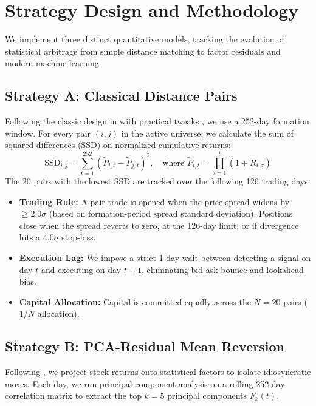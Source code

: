 \section{Strategy Design and Methodology}
\label{sec:methodology}

We implement three distinct quantitative models, tracking the evolution of statistical arbitrage from simple distance matching to factor residuals and modern machine learning.

\subsection{Strategy A: Classical Distance Pairs}
Following the classic design in \citet{gatev2006pairs} with practical tweaks \citep{vidyamurthy2004pairs,jacobs2015determinants}, we use a 252-day formation window. For every pair $(i, j)$ in the active universe, we calculate the sum of squared differences (SSD) on normalized cumulative returns:
\begin{equation}
    \text{SSD}_{i,j} = \sum_{t=1}^{252} \left( \tilde{P}_{i,t} - \tilde{P}_{j,t} \right)^2, \quad \text{where } \tilde{P}_{i,t} = \prod_{\tau=1}^t (1 + R_{i,\tau})
\end{equation}
The 20 pairs with the lowest SSD are tracked over the following 126 trading days.
\begin{itemize}
    \item \textbf{Trading Rule:} A pair trade is opened when the price spread widens by $\ge 2.0\sigma$ (based on formation-period spread standard deviation). Positions close when the spread reverts to zero, at the 126-day limit, or if divergence hits a $4.0\sigma$ stop-loss.
    \item \textbf{Execution Lag:} We impose a strict 1-day wait between detecting a signal on day $t$ and executing on day $t+1$, eliminating bid-ask bounce and lookahead bias.
    \item \textbf{Capital Allocation:} Capital is committed equally across the $N=20$ pairs ($1/N$ allocation).
\end{itemize}

\subsection{Strategy B: PCA-Residual Mean Reversion}
Following \citet{avellaneda2010statistical}, we project stock returns onto statistical factors to isolate idiosyncratic moves. Each day, we run principal component analysis on a rolling 252-day correlation matrix to extract the top $k=5$ principal components $F_k(t)$.

